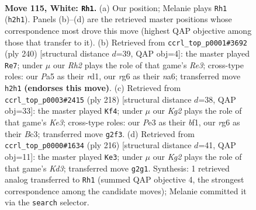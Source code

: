 \documentclass[11pt]{article}
\begin{document}
\clearpage

\begin{figure}[p]\centering
\begin{subfigure}{0.46\textwidth}\centering
\resizebox{\linewidth}{!}{%
\newchessgame
\chessboard[
  setfen={1k6/8/p5r1/P1p2p1p/1p3P1P/1P2P1P1/6KR/8 w - - 17 115},
  showmover=false,
  pgfstyle=straightmove, color=movearrow, markmove={h2-h1}
]}
\caption{}
\end{subfigure}\hfill
\begin{subfigure}{0.46\textwidth}\centering
\resizebox{\linewidth}{!}{%
\newchessgame
\chessboard[
  setfen={5k2/8/n1Bp1P1p/p1p3p1/P1P3P1/1P2R2K/8/3r4 w - - 1 121},
  showmover=false,
  pgfstyle=straightmove, color=movearrow, markmove={e3-e7}
]}
\caption{}
\end{subfigure}
\\[4pt]
\begin{subfigure}{0.46\textwidth}\centering
\resizebox{\linewidth}{!}{%
\newchessgame
\chessboard[
  setfen={6k1/2R5/4rpp1/7p/4P2P/2B1KPP1/8/5b2 w - - 53 110},
  showmover=false,
  pgfstyle=straightmove, color=movearrow, markmove={e3-f4}
]}
\caption{}
\end{subfigure}\hfill
\begin{subfigure}{0.46\textwidth}\centering
\resizebox{\linewidth}{!}{%
\newchessgame
\chessboard[
  setfen={8/2p5/3p2pk/3Pp1p1/2P1P3/1R1K1P1P/5r2/8 w - - 35 109},
  showmover=false,
  pgfstyle=straightmove, color=movearrow, markmove={d3-e3}
]}
\caption{}
\end{subfigure}
\caption{\textbf{Move 115, White: \texttt{Rh1}.} (a) Our position; Melanie plays \texttt{Rh1} (\texttt{h2h1}). Panels (b)--(d) are the retrieved master positions whose correspondence most drove this move (highest QAP objective among those that transfer to it). (b) Retrieved from \texttt{ccrl\_top\_p0001\#3692} (ply 240) [structural distance $d$=39, QAP obj=4]: the master played \texttt{Re7}; under $\mu$ our \emph{Rh2} plays the role of that game's \emph{Re3}; cross-type roles: our \emph{P}a5 as their \emph{r}d1, our \emph{r}g6 as their \emph{n}a6; transferred move \texttt{h2h1} \textbf{(endorses this move)}. (c) Retrieved from \texttt{ccrl\_top\_p0003\#2415} (ply 218) [structural distance $d$=38, QAP obj=33]: the master played \texttt{Kf4}; under $\mu$ our \emph{Kg2} plays the role of that game's \emph{Ke3}; cross-type roles: our \emph{P}e3 as their \emph{b}f1, our \emph{r}g6 as their \emph{B}c3; transferred move \texttt{g2f3}. (d) Retrieved from \texttt{ccrl\_top\_p0000\#1634} (ply 216) [structural distance $d$=41, QAP obj=11]: the master played \texttt{Ke3}; under $\mu$ our \emph{Kg2} plays the role of that game's \emph{Kd3}; transferred move \texttt{g2g1}. Synthesis: 1 retrieved analog transferred to \texttt{Rh1} (summed QAP objective 4, the strongest correspondence among the candidate moves); Melanie committed it via the \texttt{search} selector.}
\label{fig:thought-m228}
\end{figure}
\end{document}
